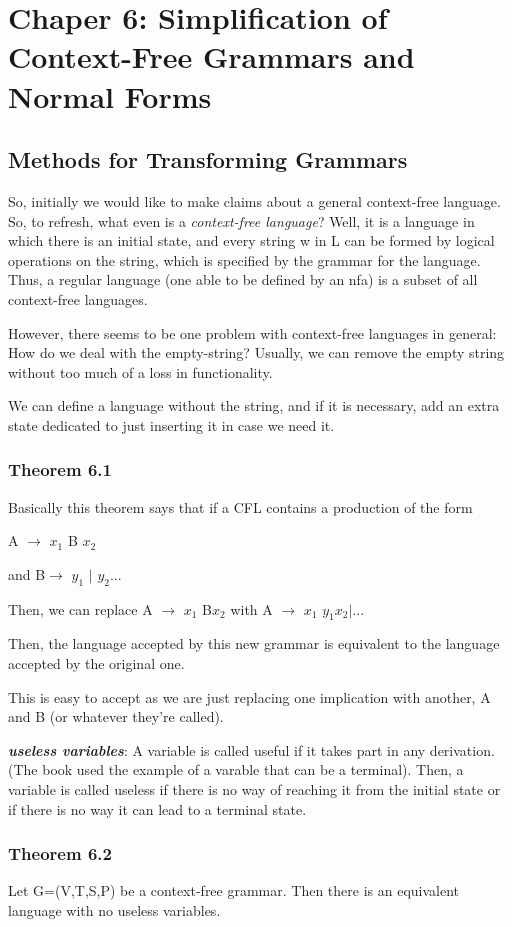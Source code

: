 \documentclass{article}
\author{tumadre}
\begin{document}
\section{Chaper 6: Simplification of Context-Free Grammars and Normal Forms}
\subsection{Methods for Transforming Grammars}

So, initially we would like to make claims about a general context-free language. So, to refresh, 
what even is a \textit{context-free language}? Well, it is a language in which there is an initial
state, and every string w in L can be formed by logical operations on the string, which is specified
by the grammar for the language. Thus, a regular language (one able to be defined by an nfa) is a subset
of all context-free languages.

However, there seems to be one problem with context-free languages in general: How do  we deal with the 
empty-string? Usually, we can remove the empty string without too much of a loss in functionality.

We can define a language without the string, and if it is necessary, add an extra state dedicated
to just inserting it in case we need it.
\subsubsection{Theorem 6.1}
Basically this theorem says that if a CFL contains a production of the form

	A $\rightarrow$ $x_1$ B $x_2$

	and B$\rightarrow$ $y_1$ $|$ $y_2$...

Then, we can replace A $\rightarrow$ $x_1$ B$x_2$  with A $\rightarrow$ $x_1$ $y_1$$x_2$$|$...

Then, the language accepted by this new grammar is equivalent to the language accepted by the original one.

This is easy to accept as we are just replacing one implication with another, A and B (or whatever they're called).

\textit{\textbf{useless variables}}: A variable is called useful if it takes part in any derivation. (The book used 
the example of a varable that can be a terminal).
Then, a variable is called useless if there is no way of reaching it from the initial state or if there is no way it 
can lead to a terminal state.
\subsubsection{Theorem 6.2}
Let G=(V,T,S,P) be a context-free grammar. Then there is an equivalent language with no useless variables.
\end{document}
